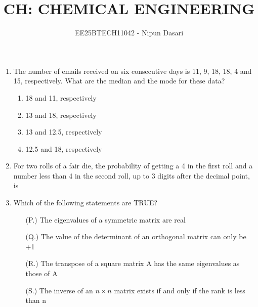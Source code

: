 \documentclass[journal,12pt,onecolumn]{IEEEtran}
\title{CH: CHEMICAL ENGINEERING}
\author{EE25BTECH11042 - Nipun Dasari}
\date{   }
\theoremstyle{remark}
\begin{document}
		
		
		\vspace{3cm}
		
		
		

	
	\begin{enumerate}
		\item The number of emails received on six consecutive days is 11, 9, 18, 18, 4 and 15, respectively. 
		What are the median and the mode for these data?
		\begin{enumerate}
			\item  18 and 11, respectively
			\item  13 and 18, respectively
			\item  13 and 12.5, respectively
			\item  12.5 and 18, respectively
		\end{enumerate} 
		
		\item For two rolls of a fair die, the probability of getting a 4 in the first roll and a number less than 4 in 
		the second roll, up to 3 digits after the decimal point, is  \underline{\hspace{2cm}} 
		
		\item Which of the following statements are TRUE?
		\begin{enumerate}
			
			\item[(P.)] The eigenvalues of a symmetric matrix are real
			\item[(Q.)] The value of the determinant of an orthogonal matrix can only be +1
			\item[(R.)] The transpose of a square matrix A has the same eigenvalues as those of A
			\item[(S.)] The inverse of an $n\times n$ matrix exists if and only if the rank is less than n
		

\end{enumerate}
\end{enumerate}
\end{document}
